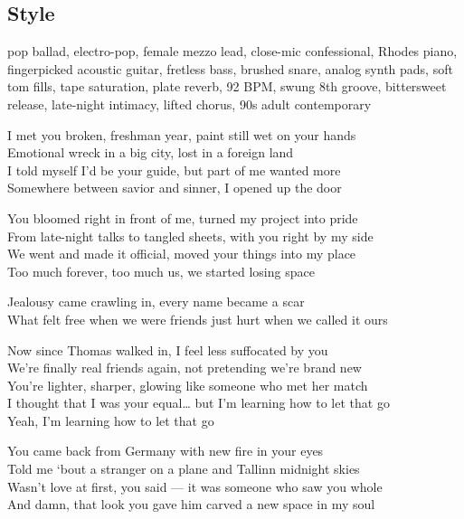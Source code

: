\subsection{Style}
pop ballad, electro-pop, female mezzo lead, close-mic confessional, Rhodes piano, fingerpicked acoustic guitar, fretless bass, brushed snare, analog synth pads, soft tom fills, tape saturation, plate reverb, 92 BPM, swung 8th groove, bittersweet release, late-night intimacy, lifted chorus, 90s adult contemporary

\begin{lyrics}

I met you broken, freshman year, paint still wet on your hands\\
Emotional wreck in a big city, lost in a foreign land\\
I told myself I’d be your guide, but part of me wanted more\\
Somewhere between savior and sinner, I opened up the door

You bloomed right in front of me, turned my project into pride\\
From late-night talks to tangled sheets, with you right by my side\\
We went and made it official, moved your things into my place\\
Too much forever, too much us, we started losing space

Jealousy came crawling in, every name became a scar\\
What felt free when we were friends just hurt when we called it ours

Now since Thomas walked in, I feel less suffocated by you\\
We’re finally real friends again, not pretending we’re brand new\\
You’re lighter, sharper, glowing like someone who met her match\\
I thought that I was your equal… but I’m learning how to let that go\\
Yeah, I’m learning how to let that go

You came back from Germany with new fire in your eyes\\
Told me ‘bout a stranger on a plane and Tallinn midnight skies\\
Wasn’t love at first, you said — it was someone who saw you whole\\
And damn, that look you gave him carved a new space in my soul


\end{lyrics}
